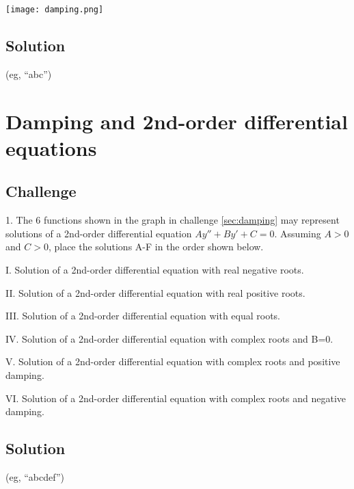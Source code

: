 \texttt{[image: damping.png]}
\subsection*{Solution}
(eg, ``abc'')





\newpage
\section{Damping and 2nd-order differential equations} %

\subsection*{Challenge}
1. The 6 functions shown in the graph in challenge \ref{sec:damping} may represent solutions of a 2nd-order differential equation $Ay'' + By' + C = 0$. Assuming $A>0$ and $C>0$, place the solutions A-F in the order shown below.%

I. Solution of a 2nd-order differential equation with real negative roots.

II. Solution of a 2nd-order differential equation with real positive roots.

III. Solution of a 2nd-order differential equation with equal roots.

IV. Solution of a 2nd-order differential equation with complex roots and B=0.

V. Solution of a 2nd-order differential equation with complex roots and positive damping.

VI. Solution of a 2nd-order differential equation with complex roots and negative damping.

\subsection*{Solution}
(eg, ``abcdef'')





